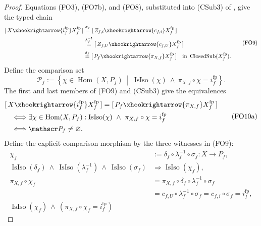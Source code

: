 \begin{proof}
  Equations (FO3), (FO7b), and (FO8), substituted into (CSub3) of
  , give the typed chain
  \[
  \begin{aligned}
    [\,X\xhookrightarrow{i_f^{\mathrm{fp}}}X_f^{\mathrm{fp}}\,]
      &\overset{\sigma_f}{=}
        [\,Z_{f,i}\xhookrightarrow{c_{f,i}}X_f^{\mathrm{fp}}\,]\\
      &\overset{\lambda_f^{-1}}{=}
        [\,Z_{f,U}\xhookrightarrow{c_{f,U}}X_f^{\mathrm{fp}}\,]\\
      &\overset{\delta_f}{=}
        [\,P_f\xhookrightarrow{\pi_{X,f}}X_f^{\mathrm{fp}}\,]
      \quad\text{in }\operatorname{ClosedSub}(X_f^{\mathrm{fp}}).
  \end{aligned}                                                     \tag{FO9}
  \]
  Define the comparison set
  \[
    \mathscr P_f:=
      \left\{\chi\in\operatorname{Hom}(X,P_f)\ \middle|\
        \operatorname{IsIso}(\chi)\ \wedge\
        \pi_{X,f}\circ\chi=i_f^{\mathrm{fp}}\right\}.            \tag{FO10}
  \]
  The first and last members of (FO9) and (CSub3) give the equivalences
  \[
  \begin{aligned}
    &[\,X\xhookrightarrow{i_f^{\mathrm{fp}}}X_f^{\mathrm{fp}}\,]
      =[\,P_f\xhookrightarrow{\pi_{X,f}}X_f^{\mathrm{fp}}\,]\\
    &\quad\Longleftrightarrow
      \exists\chi\in\operatorname{Hom}(X,P_f):
        \operatorname{IsIso}(\chi)\ \wedge\
        \pi_{X,f}\circ\chi=i_f^{\mathrm{fp}}\\
    &\quad\Longleftrightarrow\mathscr P_f\neq\varnothing.
  \end{aligned}                                                     \tag{FO10a}
  \]
  Define the explicit comparison morphism by the three witnesses in (FO9):
  \[
  \begin{aligned}
    \chi_f
      &:=\delta_f\circ\lambda_f^{-1}\circ\sigma_f
        \colon X\longrightarrow P_f,\\
    \operatorname{IsIso}(\delta_f)
      \ \wedge\ \operatorname{IsIso}(\lambda_f^{-1})
      \ \wedge\ \operatorname{IsIso}(\sigma_f)
      &\Longrightarrow\operatorname{IsIso}(\chi_f),\\
    \pi_{X,f}\circ\chi_f
      &=\pi_{X,f}\circ\delta_f\circ\lambda_f^{-1}\circ\sigma_f\\
      &=c_{f,U}\circ\lambda_f^{-1}\circ\sigma_f
       =c_{f,i}\circ\sigma_f
       =i_f^{\mathrm{fp}},\\
    \operatorname{IsIso}(\chi_f)
      \ \wedge\ (\pi_{X,f}\circ\chi_f=i_f^{\mathrm{fp}})

\end{aligned}\]
\end{proof}
